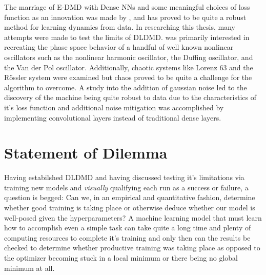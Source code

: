 The marriage of E-DMD with Dense NNs and some meaningful choices of loss function as 
an innovation was made by \cite{lago, brunton, lusch}, and has proved to be quite a 
robust method for learning dynamics from data. In researching this thesis, many attempts 
were made to test the limits of DLDMD. \cite{lago} was primarily interested in recreating 
the phase space behavior of a handful of well known nonlinear oscillators such as the 
nonlinear harmonic oscillator, the Duffing oscillator, and the Van der Pol oscillator. 
Additionally, chaotic systems like Lorenz 63 and the R\"{o}ssler system were examined but 
chaos proved to be quite a challenge for the algorithm to overcome. A study into the addition
of gaussian noise led to the discovery of the machine being quite robust to data due to the 
characteristics of it's loss function and additional noise mitigation was accomplished by 
implementing convolutional layers instead of traditional dense layers.

\section{Statement of Dilemma}
Having estabilshed DLDMD and having discussed testing it's limitations via training 
new models and \emph{visually} qualifying each run as a success or failure, a question is 
begged: Can we, in an empirical and quantitative fashion, determine whether good training 
is taking place or otherwise deduce whether our model is well-posed given the 
hyperparameters?
A machine learning model that must learn how to accomplish even a simple task can take 
quite a long time and plenty of computing resources to complete it's training and only then 
can the results be checked to determine whether productive training was taking place as 
opposed to the optimizer becoming stuck in a local minimum or there being no global 
minimum at all.

